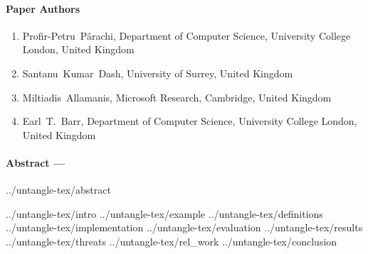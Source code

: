 \paragraph{Paper Authors}
\begin{enumerate}
    \item[] Profir-Petru~P\^arachi, Department of Computer Science, University College London, United Kingdom
    \item[] Santanu~Kumar~Dash, University of Surrey, United Kingdom
    \item[] Miltiadis~Allamanis, Microsoft Research, Cambridge, United Kingdom
    \item[] Earl~T.~Barr, Department of Computer Science, University College London, United Kingdom
\end{enumerate}

\paragraph{Abstract ---}
{../untangle-tex/abstract}

{../untangle-tex/intro}
{../untangle-tex/example}
{../untangle-tex/definitions}
{../untangle-tex/implementation}
{../untangle-tex/evaluation}
{../untangle-tex/results}
{../untangle-tex/threats}
{../untangle-tex/rel_work}
{../untangle-tex/conclusion}